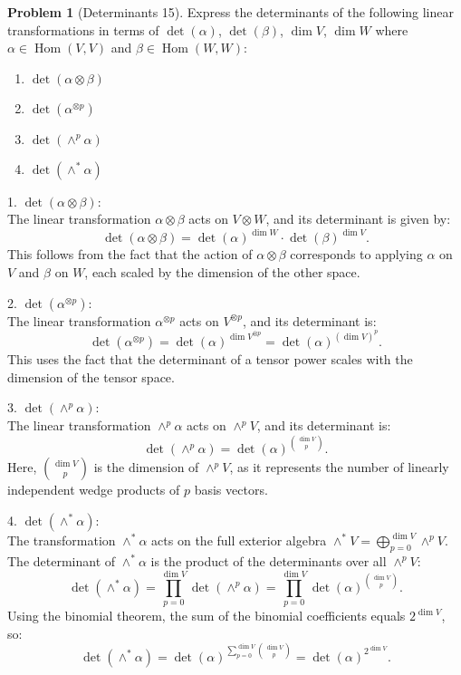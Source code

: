 \documentclass[12pt]{article}
\theoremstyle{definition}
\newtheorem{problem}{Problem}
\DeclareMathOperator{\Hom}{Hom}
\begin{document}
\begin{problem}[Determinants 15]
    Express the determinants of the following linear transformations in terms of $\det(\alpha)$, 
    $\det(\beta)$, $\dim{V}$, $\dim{W}$ where $\alpha \in \Hom(V, V)$ and $\beta \in \Hom(W, W)$:
    \begin{enumerate}
        \item $\det(\alpha \otimes \beta)$
        \item $\det(\alpha^{\otimes p})$
        \item $\det(\wedge^p\alpha)$
        \item $\det(\wedge^*\alpha)$
    \end{enumerate}

    \begin{solution}
        1. \( \det(\alpha \otimes \beta) \):\\
        The linear transformation \( \alpha \otimes \beta \) acts on \( V \otimes W \), and its determinant is given by:
        \[
        \det(\alpha \otimes \beta) = \det(\alpha)^{\dim W} \cdot \det(\beta)^{\dim V}.
        \]
        This follows from the fact that the action of \( \alpha \otimes \beta \) corresponds to applying \( \alpha \) on \( V \) and \( \beta \) on \( W \), each scaled by the dimension of the other space.

        2. \( \det(\alpha^{\otimes p}) \):\\ 
        The linear transformation \( \alpha^{\otimes p} \) acts on \( V^{\otimes p} \), and its determinant is:
        \[
        \det(\alpha^{\otimes p}) = \det(\alpha)^{\dim V^{\otimes p}} = \det(\alpha)^{(\dim V)^p}.
        \]
        This uses the fact that the determinant of a tensor power scales with the dimension of the tensor space.

        3. \( \det(\wedge^p \alpha) \):\\
        The linear transformation \( \wedge^p \alpha \) acts on \( \wedge^p V \), and its determinant is:
        \[
        \det(\wedge^p \alpha) = \det(\alpha)^{\binom{\dim V}{p}}.
        \]
        Here, \( \binom{\dim V}{p} \) is the dimension of \( \wedge^p V \), as it represents the number of linearly independent wedge products of \( p \) basis vectors.

        4. \( \det(\wedge^* \alpha) \):\\ 
        The transformation \( \wedge^* \alpha \) acts on the full exterior algebra \( \wedge^* V = \bigoplus_{p=0}^{\dim V} \wedge^p V \). The determinant of \( \wedge^* \alpha \) is the product of the determinants over all \( \wedge^p V \):
        \[
        \det(\wedge^* \alpha) = \prod_{p=0}^{\dim V} \det(\wedge^p \alpha) = \prod_{p=0}^{\dim V} \det(\alpha)^{\binom{\dim V}{p}}.
        \]
        Using the binomial theorem, the sum of the binomial coefficients equals \( 2^{\dim V} \), so:
        \[
        \det(\wedge^* \alpha) = \det(\alpha)^{\sum_{p=0}^{\dim V} \binom{\dim V}{p}} = \det(\alpha)^{2^{\dim V}}.
        \]
    \end{solution}
\end{problem}
\end{document}
